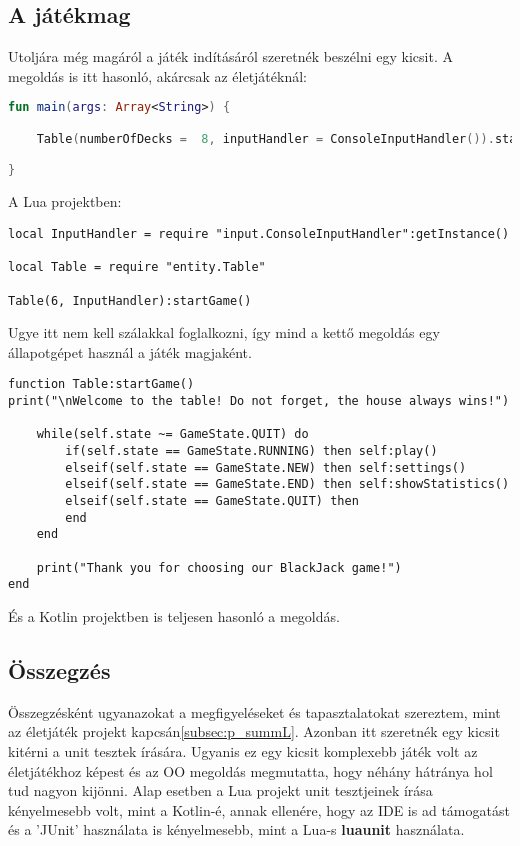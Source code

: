 \subsection{A játékmag}

Utoljára még magáról a játék indításáról szeretnék beszélni egy kicsit. A megoldás is itt hasonló, akárcsak az életjátéknál:
\scriptsize
\begin{lstlisting}[language = Kotlin]
fun main(args: Array<String>) {

	Table(numberOfDecks =  8, inputHandler = ConsoleInputHandler()).startGame()

}
\end{lstlisting}
\normalsize
A Lua projektben:
\scriptsize
\begin{lstlisting}[style=Lua]
local InputHandler = require "input.ConsoleInputHandler":getInstance()

local Table = require "entity.Table"

Table(6, InputHandler):startGame()
\end{lstlisting}
\normalsize
\newpage
Ugye itt nem kell szálakkal foglalkozni, így mind a kettő megoldás egy állapotgépet használ a játék magjaként.
\scriptsize
\begin{lstlisting}[style=Lua]
function Table:startGame()
print("\nWelcome to the table! Do not forget, the house always wins!")
	
	while(self.state ~= GameState.QUIT) do
		if(self.state == GameState.RUNNING) then self:play()
		elseif(self.state == GameState.NEW) then self:settings()
		elseif(self.state == GameState.END) then self:showStatistics()
		elseif(self.state == GameState.QUIT) then
		end
	end
	
	print("Thank you for choosing our BlackJack game!")
end
\end{lstlisting}
\normalsize
És a Kotlin projektben is teljesen hasonló a megoldás.
\subsection{Összegzés}

Összegzésként ugyanazokat a megfigyeléseket és tapasztalatokat szereztem, mint az életjáték projekt kapcsán\ref{subsec:p_summL}. Azonban itt szeretnék egy kicsit kitérni a unit tesztek írására. Ugyanis ez egy kicsit komplexebb játék volt az életjátékhoz képest és az OO megoldás megmutatta, hogy néhány hátránya hol tud nagyon kijönni. Alap esetben a Lua projekt unit tesztjeinek írása kényelmesebb volt, mint a Kotlin-é, annak ellenére, hogy az IDE is ad támogatást és a 'JUnit' használata is kényelmesebb, mint a Lua-s \textbf{luaunit} használata.

